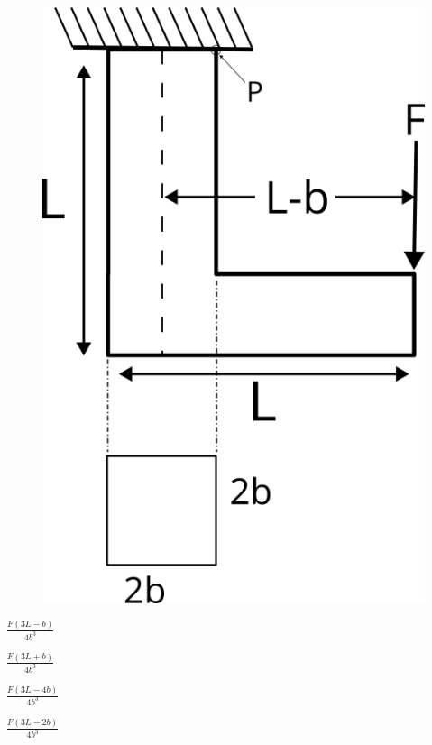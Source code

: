\documentclass[journal,12pt,onecolumn]{IEEEtran}
\begin{document}
\begin{enumerate}
          \begin{figure}[H]
              \centering
              \includegraphics[scale=0.3]{q31}
              \caption{}
              \label{q31}
          \end{figure}

          \begin{enumerate}
              \begin{multicols}{4}
                  \item $\frac{F(3L-b)}{4b^3}$
                  \item $\frac{F(3L+b)}{4b^3}$
                  \item $\frac{F(3L-4b)}{4b^3}$
                  \item $\frac{F(3L-2b)}{4b^3}$
              \end{multicols}
          \end{enumerate}


\end{enumerate}
\end{document}
